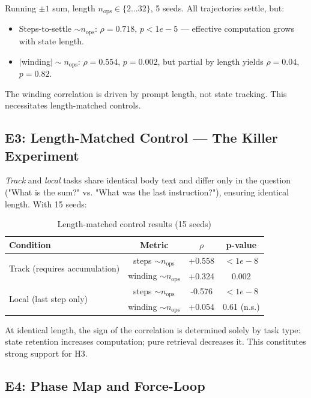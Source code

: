 \documentclass[12pt,a4paper]{article}
\begin{document}
Running $\pm1$ sum, length $n_{\text{ops}} \in \{2\ldots 32\}$, 5 seeds. All trajectories settle, but:

\begin{itemize}
    \item Steps-to-settle $\sim n_{\text{ops}}$: $\rho = 0.718$, $p < 1e-5$ — effective computation grows with state length.
    \item $|$winding$| \sim n_{\text{ops}}$: $\rho = 0.554$, $p = 0.002$, but partial by length yields $\rho = 0.04$, $p = 0.82$.
\end{itemize}

The winding correlation is driven by prompt length, not state tracking. This necessitates length-matched controls.

\subsection{E3: Length-Matched Control — The Killer Experiment}

\textit{Track} and \textit{local} tasks share identical body text and differ only in the question ("What is the sum?" vs. "What was the last instruction?"), ensuring identical length. With 15 seeds:

\begin{table}[h]
\centering
\caption{Length-matched control results (15 seeds)}
\begin{tabular}{lccc}
\toprule
Condition & Metric & $\rho$ & p-value \\
\midrule
\multirow{2}{*}{Track (requires accumulation)} & steps $\sim n_{\text{ops}}$ & +0.558 & $< 1e-8$ \\
 & winding $\sim n_{\text{ops}}$ & +0.324 & 0.002 \\
\multirow{2}{*}{Local (last step only)} & steps $\sim n_{\text{ops}}$ & -0.576 & $< 1e-8$ \\
 & winding $\sim n_{\text{ops}}$ & +0.054 & 0.61 (n.s.) \\
\bottomrule
\end{tabular}
\end{table}

At identical length, the sign of the correlation is determined solely by task type: state retention increases computation; pure retrieval decreases it. This constitutes strong support for H3.

\subsection{E4: Phase Map and Force-Loop}
\end{document}
